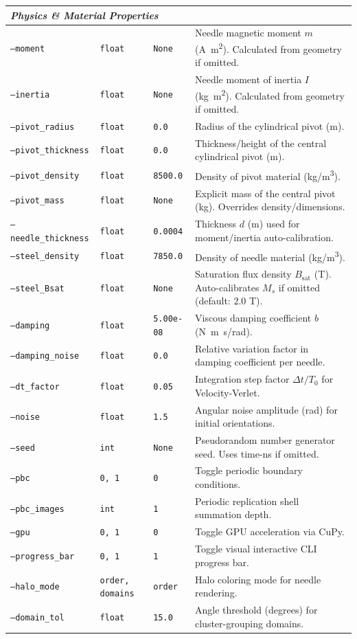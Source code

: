 \documentclass[11pt,a4paper]{article}
\newcommand{\code}[1]{\texttt{#1}}
\begin{document}
\begin{longtable}{lp{3.5cm}lp{6.0cm}}
\multicolumn{4}{l}{\textit{Physics \& Material Properties}} \\
\midrule
\code{--moment} & \code{float} & \code{None} & Needle magnetic moment $m$ (\si{A.m^2}). Calculated from geometry if omitted. \\
\code{--inertia} & \code{float} & \code{None} & Needle moment of inertia $I$ (\si{kg.m^2}). Calculated from geometry if omitted. \\
\code{--pivot\_radius} & \code{float} & \code{0.0} & Radius of the cylindrical pivot (\si{m}). \\
\code{--pivot\_thickness} & \code{float} & \code{0.0} & Thickness/height of the central cylindrical pivot (\si{m}). \\
\code{--pivot\_density} & \code{float} & \code{8500.0} & Density of pivot material (\si{kg/m^3}). \\
\code{--pivot\_mass} & \code{float} & \code{None} & Explicit mass of the central pivot (\si{kg}). Overrides density/dimensions. \\
\code{--needle\_thickness} & \code{float} & \code{0.0004} & Thickness $d$ (\si{m}) used for moment/inertia auto-calibration. \\
\code{--steel\_density} & \code{float} & \code{7850.0} & Density of needle material (\si{kg/m^3}). \\
\code{--steel\_Bsat} & \code{float} & \code{None} & Saturation flux density $B_{\text{sat}}$ (\si{T}). Auto-calibrates $M_s$ if omitted (default: $2.0$ T). \\
\code{--damping} & \code{float} & \code{5.00e-08} & Viscous damping coefficient $b$ (\si{N.m.s/rad}). \\
\code{--damping\_noise} & \code{float} & \code{0.0} & Relative variation factor in damping coefficient per needle. \\
\code{--dt\_factor} & \code{float} & \code{0.05} & Integration step factor $\Delta t / T_0$ for Velocity-Verlet. \\
\code{--noise} & \code{float} & \code{1.5} & Angular noise amplitude (\si{rad}) for initial orientations. \\
\code{--seed} & \code{int} & \code{None} & Pseudorandom number generator seed. Uses time-ns if omitted. \\
\code{--pbc} & \code{0, 1} & \code{0} & Toggle periodic boundary conditions. \\
\code{--pbc\_images} & \code{int} & \code{1} & Periodic replication shell summation depth. \\
\code{--gpu} & \code{0, 1} & \code{0} & Toggle GPU acceleration via CuPy. \\
\code{--progress\_bar} & \code{0, 1} & \code{1} & Toggle visual interactive CLI progress bar. \\
\code{--halo\_mode} & \code{order, domains} & \code{order} & Halo coloring mode for needle rendering. \\
\code{--domain\_tol} & \code{float} & \code{15.0} & Angle threshold (degrees) for cluster-grouping domains. \\
\midrule


\end{longtable}
\end{document}

